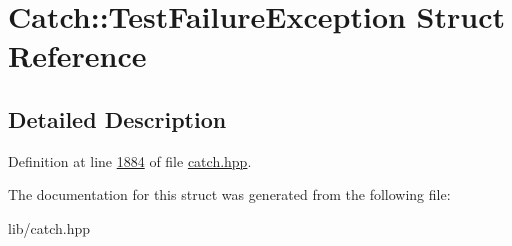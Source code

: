 \hypertarget{structCatch_1_1TestFailureException}{}\section{Catch\+::Test\+Failure\+Exception Struct Reference}
\label{structCatch_1_1TestFailureException}


\subsection{Detailed Description}


Definition at line \mbox{\hyperlink{catch_8hpp_source_l01884}{1884}} of file \mbox{\hyperlink{catch_8hpp_source}{catch.\+hpp}}.



The documentation for this struct was generated from the following file\+:\begin{DoxyCompactItemize}
\item 
lib/catch.\+hpp\end{DoxyCompactItemize}
